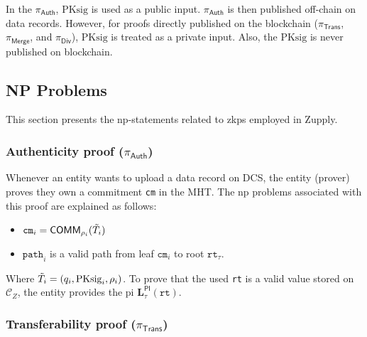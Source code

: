 

\begin{remark} 
In the $\pi_\textsf{Auth}$, $\text{PKsig}$ is used as a public input. $\pi_\textsf{Auth}$ is then published off-chain on data records. However, for proofs directly published on the blockchain ($\pi_\textsf{Trans}$, $\pi_\textsf{Merge}$, and $\pi_\textsf{Div}$), $\text{PKsig}$ is treated as a private input. Also, the $\text{PKsig}$ is never published on blockchain. 
\end{remark}




\subsection{NP Problems}
\label{sec:Zero-knowledge Proofs}
This section presents the \gls{np}-statements related to \gls{zkp}s employed in Zupply. 


\subsubsection{Authenticity proof ($\pi_\textsf{Auth}$)}
Whenever an entity wants to upload a data record on DCS, the entity (prover) proves they own a commitment \texttt{cm} in the \textsf{MHT}. The \gls{np} problems associated with this proof are explained as follows:

    
\begin{itemize}

    \item $\texttt{cm}_i =\mathsf{COMM}_{\rho_i}(\Tilde{T}_i)$
	\item $\texttt{path}_i$ is a valid path from leaf  $\texttt{cm}_i$ to root $\texttt{rt}_\tau$.
\end{itemize}

Where $\Tilde{T}_i = (q_i, \text{PKsig}_i, \rho_i)$. To prove that the used \texttt{rt} is a valid value stored on $\mathcal{C}_Z$, the entity provides the \gls{pi} $\mathbf{L}_\tau^\mathsf{PI}(\texttt{rt})$.



\subsubsection{Transferability proof ($\pi_\textsf{Trans}$)}


